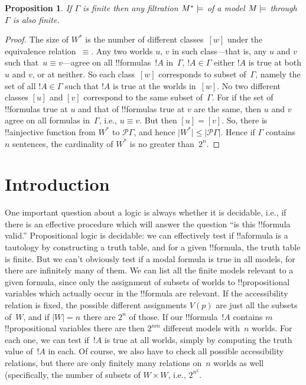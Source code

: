 \documentclass[10pt,a4paper]{article}
\theoremstyle{plain}
\newtheorem{prop}[thm]{Proposition}
\theoremstyle{definition}
\theoremstyle{remark}
\newcommand*{\olfileid}[3]{}
\newcommand*{\olsection}[1]{\section*{#1}}
\newcommand*{\ollabel}[1]{\label{#1}}
\providecommand{\mModel}[2]{\ensuremath{#1 \models #2}}
\providecommand{\card}[1]{\lvert #1 \rvert}
\providecommand{\Pow}{\mathcal{P}}
\begin{document}
\begin{prop}\ollabel{prop:filt-are-finite}
  If $\Gamma$ is finite then any filtration $\mModel{M^*}$ of a model
  $\mModel{M}$ through $\Gamma$ is also finite.
\end{prop}

\begin{proof}
  The size of $W^*$ is the number of different classes~$[w]$ under the
  equivalence relation~$\equiv$. Any two worlds $u$, $v$ in such
  class---that is, any $u$ and $v$ such that~$u \equiv v$---agree on
  all !!{formula}s~$!A$ in~$\Gamma$, $!A \in \Gamma$ either $!A$ is
  true at both $u$ and $v$, or at neither. So each class~$[w]$
  corresponds to subset of~$\Gamma$, namely the set of all $!A \in
  \Gamma$ such that $!A$ is true at the worlds in~$[w]$. No two
  different classes $[u]$ and $[v]$ correspond to the same subset
  of~$\Gamma$. For if the set of !!{formula}s true at $u$ and that of
  !!{formula}s true at $v$ are the same, then $u$ and $v$ agree on all
  formulas in~$\Gamma$, i.e., $u \equiv v$. But then $[u] = [v]$.  So,
  there is !!a{injective} function from $W^*$ to $\Pow{\Gamma}$, and
  hence $\card{W^*} \le \card{\Pow{\Gamma}}$.  Hence if $\Gamma$
  contains $n$ sentences, the cardinality of $W^*$ is no greater
  than~$2^n$.
\end{proof}







\olfileid{nml}{fil}{int}

\olsection{Introduction}

One important question about a logic is always whether it is
decidable, i.e., if there is an effective procedure which will answer
the question ``is this !!{formula} valid.'' Propositional logic is
decidable: we can effectively test if !!a{formula} is a tautology by
constructing a truth table, and for a given !!{formula}, the truth
table is finite.  But we can't obviously test if a modal formula is
true in all models, for there are infinitely many of them.  We can
list all the finite models relevant to a given formula, since only the
assignment of subsets of worlds to !!{propositional variable}s which
actually occur in the !!{formula} are relevant. If the accessibility
relation is fixed, the possible different assignments $V(p)$ are just
all the subsets of~$W$, and if $\card{W} = n$ there are $2^n$ of
those. If our !!{formula}~$!A$ contains $m$ !!{propositional
  variable}s there are then $2^{nm}$ different models with~$n$
worlds. For each one, we can test if~$!A$ is true at all worlds,
simply by computing the truth value of~$!A$ in each. Of course, we
also have to check all possible accessibility relations, but there are
only finitely many relations on~$n$ worlds as well (specifically, the
number of subsets of $W \times W$, i.e., $2^{n^2}$.
\end{document}
